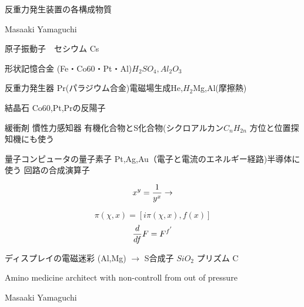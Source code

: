 \documentclass{jsarticle}
\begin{document}
{\newpage
\begin{center}
\large	反重力発生装置の各構成物質
	\end{center}
\begin{center}
	Masaaki Yamaguchi
\end{center}



  原子振動子　セシウム Cs


  形状記憶合金 (Fe・Co60・Pt・Al)$H_2 SO_4, Al_2 O_3$


  反重力発生器 Pr(パラジウム合金)電磁場生成He,$H_2$Mg,Al(摩擦熱)


  結晶石 Co60,Pt,Prの反陽子


  緩衝剤 慣性力感知器 有機化合物とS化合物(シクロアルカン$C_n H_{2n}$
  方位と位置探知機にも使う


  量子コンピュータの量子素子 Pt,Ag,Au（電子と電流のエネルギー経路)半導体に
  使う
  回路の合成演算子 


  $$ x^y = {1 \over {y^x}} \to $$

  $$ \pi(\chi,x) = [i\pi(\chi,x),f(x)] $$
  $$ {d \over df}F = F^{{f}^{'}} $$


  ディスプレイの電磁迷彩 (Al,Mg) $\to$ S合成子 $Si O_2 $
  プリズム C

\begin{center}
\large	Amino medicine architect with non-controll from out of pressure
\end{center}
\begin{center}
	Masaaki Yamaguchi
\end{center}


}
\end{document}
